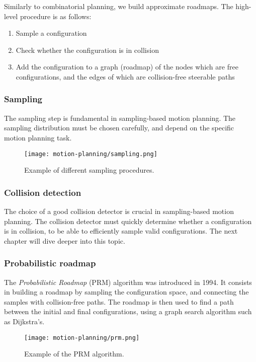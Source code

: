 Similarly to combinatorial planning, we build approximate roadmaps. The high-level procedure is as follows:
\begin{enumerate}
    \item Sample a configuration
    \item Check whether the configuration is in collision
    \item Add the configuration to a graph (roadmap) of the nodes which are free configurations, and the edges of which are collision-free steerable paths
\end{enumerate}

\subsubsection{Sampling}
The sampling step is fundamental in sampling-based motion planning. The sampling distribution must be chosen carefully, and depend on the specific motion planning task.
\begin{figure}[h]
    \centering
    \texttt{[image: motion-planning/sampling.png]}
    \caption{Example of different sampling procedures.}
\end{figure}

\subsubsection{Collision detection}
The choice of a good collision detector is crucial in sampling-based motion planning. The collision detector must quickly determine whether a configuration is in collision, to be able to efficiently sample valid configurations. The next chapter will dive deeper into this topic.

\subsubsection{Probabilistic roadmap}
The \emph{Probabilistic Roadmap} (PRM) algorithm was introduced in 1994. It consists in building a roadmap by sampling the configuration space, and connecting the samples with collision-free paths. The roadmap is then used to find a path between the initial and final configurations, using a graph search algorithm such as Dijkstra's.
\begin{figure}[H]
    \centering
    \texttt{[image: motion-planning/prm.png]}
    \caption{Example of the PRM algorithm.}
\end{figure}

